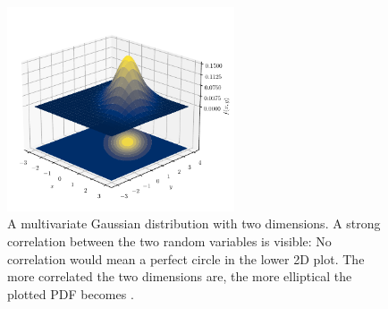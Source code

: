 \documentclass[%
  a4paper,oneside,%
  11pt,%
  smallchapters,
  style=printdev,
  extramargin,
  green,%
  rgb, <cmyk>
  ]{tubsbook}
\begin{document}
\begin{figure}[!ht]
\begin{center}
\includegraphics[width=0.6\textwidth]{pics/Gaussians}
\caption[A bivariate Gaussian distribution]{A multivariate Gaussian distribution with two dimensions. A strong correlation between the two random variables is visible: No correlation would mean a perfect circle in the lower 2D plot. The more correlated the two dimensions are, the more elliptical the plotted PDF becomes \cite{Virtanen2020}.  }
\label{fig:MultiGauss}
\end{center}
\end{figure}
\end{document}
